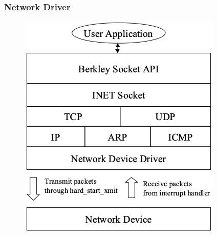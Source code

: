 % 
% 
\begin{frame}[fragile]
    \frametitle{Network Driver}
    \begin{figure}
    \includegraphics[width=0.42\linewidth]{figs/network-driver.png}
    \end{figure}
\end{frame}
% 
% 
